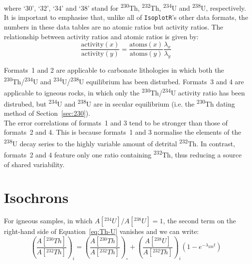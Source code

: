 \begin{refsection}
\noindent where `30', `32', `34' and `38' stand for
\textsuperscript{230}Th, \textsuperscript{232}Th,
\textsuperscript{234}U and \textsuperscript{238}U, respectively.  It
is important to emphasise that, unlike all of \texttt{IsoplotR}'s
other data formats, the numbers in these data tables are no atomic
ratios but activity ratios. The relationship between activity ratios
and atomic ratios is given by:
\begin{equation}
  \frac{\mbox{activity}(x)}{\mbox{activity}(y)} =
  \frac{\mbox{atoms}(x)}{\mbox{atoms}(y)}
  \frac{\lambda_{x}}{\lambda_{y}}
\end{equation}

Formats~1 and 2 are applicable to carbonate lithologies in which both
the \textsuperscript{230}Th/\textsuperscript{234}U and
\textsuperscript{234}U/\textsuperscript{238}U equilibrium has been
disturbed. Formats~3 and 4 are applicable to igneous rocks, in which
only the \textsuperscript{230}Th/\textsuperscript{234}U activity ratio
has been distrubed, but \textsuperscript{234}U and
\textsuperscript{238}U are in secular equilibrium (i.e. the
\textsuperscript{230}Th dating method of Section~\ref{sec:230}).\\

The error correlations of formats~1 and 3 tend to be stronger than
those of formats~2 and 4. This is because formats~1 and 3 normalise
the elements of the \textsuperscript{238}U decay series to the highly
variable amount of detrital \textsuperscript{232}Th. In contrast,
formats~2 and 4 feature only one ratio containing
\textsuperscript{232}Th, thus reducing a source of shared variability.

\section{Isochrons}

For igneous samples, in which $A[{}^{234}U]/A[{}^{238}U] = 1$, the
second term on the right-hand side of Equation~\ref{eq:Th-U} vanishes
and we can write:
\begin{equation}
  \left(\frac{A[{}^{230}Th]}{A[{}^{232}Th]}\right)_i = 
  \left(\frac{A[{}^{230}Th]}{A[{}^{232}Th]}\right)_\circ +
  \left(\frac{A[{}^{238}U]}{A[{}^{232}Th]}\right)_i
  \left(1-e^{-\lambda_{230}t}\right)
  \label{eq:rosholt}
\end{equation}


\end{refsection}
